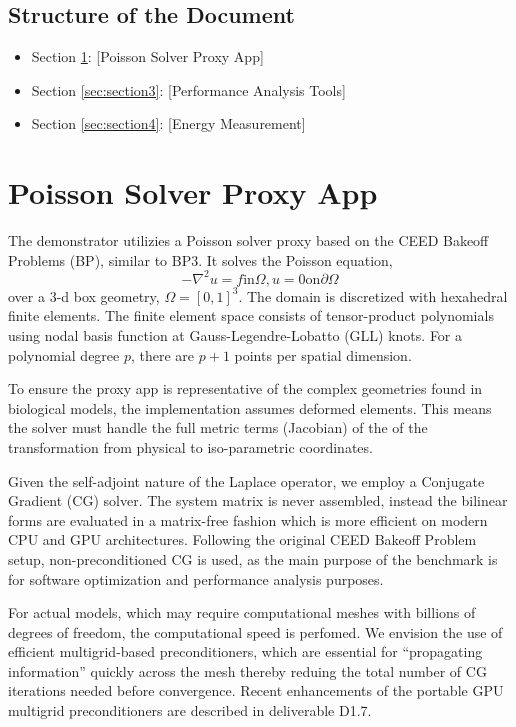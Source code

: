 \documentclass[a4paper,12pt]{article}
\begin{document}
\subsection{{Structure of the Document}}
\begin{itemize}
    \item Section \ref{sec:section2}: [Poisson Solver Proxy App]
    \item Section \ref{sec:section3}: [Performance Analysis Tools]
    \item Section \ref{sec:section4}: [Energy Measurement]
\end{itemize}

\newpage

\section{{Poisson Solver Proxy App}}
\label{sec:section2}

The demonstrator utilizies a Poisson solver proxy based on the CEED Bakeoff Problems (BP),
similar to BP3. It solves the Poisson equation,
$$
-\nabla^2 u = f \text{in} \Omega, u = 0 \text{on} \partial \Omega
$$
over a 3-d box geometry, $\Omega = [0,1]^3$.
The domain is discretized with hexahedral finite elements.
The finite element space consists of tensor-product polynomials using
nodal basis function at Gauss-Legendre-Lobatto (GLL) knots.
For a polynomial degree $p$, there are $p+1$ points per spatial dimension.


To ensure the proxy app is representative of the complex geometries found in
biological models, the implementation assumes deformed elements.
This means the solver must handle the full metric terms (Jacobian) of the
of the transformation from physical to iso-parametric coordinates.

Given the self-adjoint nature of the Laplace operator, we employ a Conjugate Gradient (CG) solver.
The system matrix is never assembled, instead the bilinear forms are evaluated in
a matrix-free fashion which is more efficient on modern CPU and GPU architectures.
Following the original CEED Bakeoff Problem setup, non-preconditioned CG is used,
as the main purpose of the benchmark is for software optimization
and performance analysis purposes.

For actual models, which may require computational meshes with billions of degrees
of freedom, the computational speed is perfomed.
We envision the use of efficient multigrid-based preconditioners, which are
essential for ``propagating information'' quickly across the mesh thereby
reduing the total number of CG iterations needed before convergence.
Recent enhancements of the portable GPU multigrid preconditioners are
described in deliverable D1.7.
\end{document}
